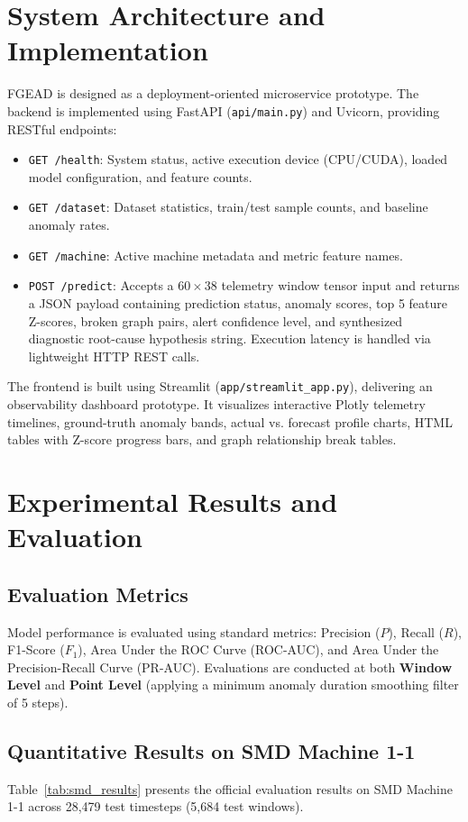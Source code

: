 \documentclass[conference]{IEEEtran}
\begin{document}
\section{System Architecture and Implementation}

FGEAD is designed as a deployment-oriented microservice prototype. The backend is implemented using FastAPI (\texttt{api/main.py}) and Uvicorn, providing RESTful endpoints:
\begin{itemize}
    \item \texttt{GET /health}: System status, active execution device (CPU/CUDA), loaded model configuration, and feature counts.
    \item \texttt{GET /dataset}: Dataset statistics, train/test sample counts, and baseline anomaly rates.
    \item \texttt{GET /machine}: Active machine metadata and metric feature names.
    \item \texttt{POST /predict}: Accepts a $60 \times 38$ telemetry window tensor input and returns a JSON payload containing prediction status, anomaly scores, top 5 feature Z-scores, broken graph pairs, alert confidence level, and synthesized diagnostic root-cause hypothesis string. Execution latency is handled via lightweight HTTP REST calls.
\end{itemize}

The frontend is built using Streamlit (\texttt{app/streamlit\_app.py}), delivering an observability dashboard prototype. It visualizes interactive Plotly telemetry timelines, ground-truth anomaly bands, actual vs. forecast profile charts, HTML tables with Z-score progress bars, and graph relationship break tables.

\section{Experimental Results and Evaluation}

\subsection{Evaluation Metrics}
Model performance is evaluated using standard metrics: Precision ($P$), Recall ($R$), F1-Score ($F_1$), Area Under the ROC Curve (ROC-AUC), and Area Under the Precision-Recall Curve (PR-AUC). Evaluations are conducted at both \textbf{Window Level} and \textbf{Point Level} (applying a minimum anomaly duration smoothing filter of 5 steps).

\subsection{Quantitative Results on SMD Machine 1-1}
Table~\ref{tab:smd_results} presents the official evaluation results on SMD Machine 1-1 across 28,479 test timesteps (5,684 test windows).
\end{document}
